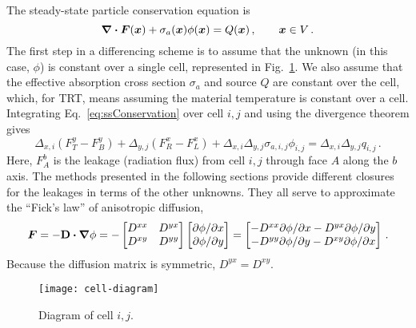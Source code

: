 The steady-state particle conservation equation is
\begin{equation}\label{eq:ssConservation}
  \bm{\nabla} \bm{\cdot} \bm{F}(\bm{x}) + \sigma_a(\bm{x}) \phi(\bm{x}) =
  Q(\bm{x})\,,\qquad \bm{x} \in V\,.
\end{equation}
The first step in a differencing scheme is to assume that the unknown
(in this case, $\phi$) is constant over a single cell, represented in
Fig.~\ref{fig:cellDiagram}. We also assume that the effective absorption cross
section $\sigma_a$ and source $Q$ are
constant over the cell, which, for TRT, means assuming the material temperature
is constant over a cell. Integrating Eq.~\eqref{eq:ssConservation} over cell
$i,j$ and using the divergence theorem gives
\begin{equation} \label{eq:ssConservationDisc}
  \Delta_{x,i} \left( F_T^y - F_B^y \right)
+ \Delta_{y,j} \left( F_R^x - F_L^x \right)
+ \Delta_{x,i}\Delta_{y,j} \sigma_{a,i,j} \phi_{i,j}
= \Delta_{x,i}\Delta_{y,j} q_{i,j}\,.
\end{equation}
Here, $F_A^b$ is the leakage (radiation flux) from cell $i,j$ through face $A$
along the $b$ axis. The methods presented in the following sections provide
different closures for the leakages in terms of the other unknowns. They all
serve to approximate the ``Fick's law'' of anisotropic diffusion,
\begin{equation}\label{eq:anisotropicFicks2d}
  \bm{F} = - \mathbf{D} \bm{\cdot} \bm{\nabla} \phi
  = -
  \begin{bmatrix}
    D^{xx} & D^{yx} \\
    D^{xy} & D^{yy}
  \end{bmatrix}
  \begin{bmatrix}
    {\partial \phi}/{\partial x} \\
    {\partial \phi}/{\partial y}
  \end{bmatrix}
  = 
  \begin{bmatrix}
    - D^{xx} {\partial \phi}/{\partial x}
    - D^{yx} {\partial \phi}/{\partial y} \\
    - D^{yy} {\partial \phi}/{\partial y}
    - D^{xy} {\partial \phi}/{\partial x}
  \end{bmatrix}
  \,.
\end{equation}
Because the diffusion matrix is symmetric, $D^{yx}=D^{xy}$.

\begin{figure}[htb]
  \centering
  \texttt{[image: cell-diagram]}
  \caption{Diagram of cell $i,j$.}
  \label{fig:cellDiagram}
\end{figure}

